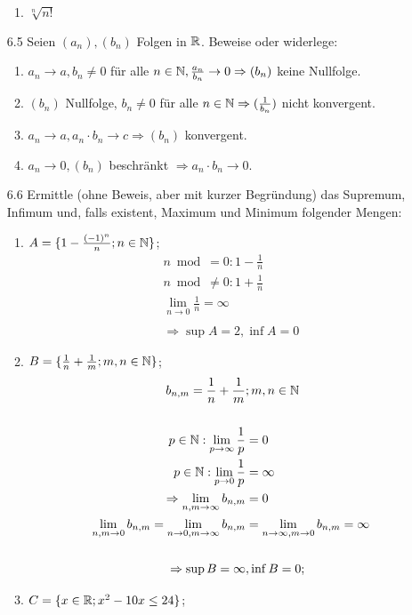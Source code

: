 \documentclass{HM}
\begin{document}
\begin{enumerate}
\begin{enumerate}
		\item $\sqrt[n]{n!}$\\
		
	\end{enumerate}
	\item[6.5] Seien $(a_n), (b_n)$ Folgen in $\mathbb{R}$. Beweise oder widerlege:
	\begin{enumerate}
		\item $a_n\to a, b_n\neq 0$ für alle $n\in\mathbb{N}, \frac{a_n}{b_n}\to 0 \Rightarrow (b_n)$ keine Nullfolge.
		\item $(b_n)$ Nullfolge, $b_n\neq 0$ für alle $n\in\mathbb{N}\Rightarrow (\frac{1}{b_n})$ nicht konvergent.
		\item $a_n\to a, a_n\cdot b_n \to c \Rightarrow (b_n)$ konvergent.
		\item $a_n\to 0, (b_n)$ beschränkt $\Rightarrow a_n\cdot b_n \to 0$.
	\end{enumerate}
	\item[6.6] Ermittle (ohne Beweis, aber mit kurzer Begründung) das Supremum, Infimum und, falls existent, Maximum und Minimum folgender Mengen:
	\begin{enumerate}
		\item $A=\lbrace 1-\frac{(-1)^n}{n}; n\in\mathbb{N}\rbrace$;
		\begin{align*}
			n\bmod=0:1-\frac{1}{n}\\
			n\bmod\neq0:1+\frac{1}{n}\\
			\lim_{n\to 0} \frac{1}{n} = \infty\\\\
			\Rightarrow \sup A = 2,\inf A = 0
		\end{align*}
		\item $B=\lbrace \frac{1}{n}+\frac{1}{m}; m,n\in\mathbb{N}\rbrace$;
		\begin{align*}
			b_{n,m} = \frac{1}{n}+ \frac{1}{m}&;m,n\in \mathbb{N}\\
\\
			p\in \mathbb{N}:\lim_{p\to \infty}\frac{1}{p} &= 0\\
			p\in \mathbb{N}:\lim_{p\to 0}\frac{1}{p} &= \infty\\
			\Rightarrow \lim_{n,m\to \infty} b_{n,m} &= 0\\
			\lim_{n,m\to 0} b_{n,m} = 
			\lim_{n\to 0,m\to \infty} b_{n,m} &= 
			\lim_{n\to \infty,m\to 0} b_{n,m} = \infty\\\\
			\Rightarrow \sup B = \infty&,\inf B = 0;
		\end{align*}
		\item $C=\lbrace x\in\mathbb{R}; x^2-10x\leq 24\rbrace$;

\end{enumerate}
\end{enumerate}
\end{document}

